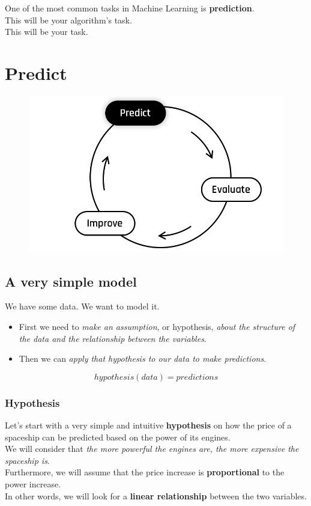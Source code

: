 One of the most common tasks in Machine Learning is \textbf{prediction}.\\  
This will be your algorithm's task.\\
This will be your task.  

\newpage
\section*{Predict}
\begin{figure}[h!]
  \centering
  \includegraphics[scale=0.25]{assets/Predict.png}
\end{figure}

\subsection*{A very simple model}

We have some data. We want to model it.  
\begin{itemize}
    \item First we need to \textit{make an assumption}, or hypothesis, \textit{about the structure of the data and the relationship between the variables}.  
    \item Then we can \textit{apply that hypothesis to our data to make predictions}.
\end{itemize}

$$
hypothesis(data) = predictions
$$

\subsubsection*{Hypothesis}
Let's start with a very simple and intuitive \textbf{hypothesis} on how the price of a spaceship can be predicted based on the power of its engines.\\
We will consider that \textit{the more powerful the engines are, the more expensive the spaceship is}.\\
Furthermore, we will assume that the price increase is \textbf{proportional} to the power increase.\\
\newline
In other words, we will look for a \textbf{linear relationship} between the two variables.\\

